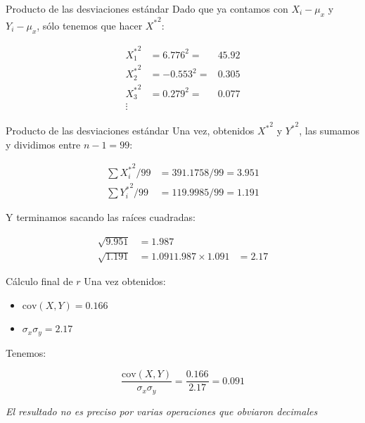 \documentclass[
  11pt,
  ignorenonframetext,
]{beamer}
\providecommand{\tightlist}{%
  \setlength{\itemsep}{0pt}\setlength{\parskip}{0pt}}
\begin{document}
\begin{frame}{Producto de las desviaciones estándar}
\protect\hypertarget{producto-de-las-desviaciones-estuxe1ndar-1}{}
Dado que ya contamos con \(X_i - \mu_x\) y \(Y_i - \mu_x\), sólo tenemos
que hacer \({X^*}^2\):

\begin{align*}
{X^*_1}^2 & = 6.776^2 = & 45.92 \\
{X^*_2}^2 & = -0.553^2 = & 0.305 \\
{X^*_3}^2 & = 0.279^2 = & 0.077 \\
\vdots
\end{align*}
\end{frame}

\begin{frame}{Producto de las desviaciones estándar}
\protect\hypertarget{producto-de-las-desviaciones-estuxe1ndar-2}{}
Una vez, obtenidos \({X^*}^2\) y \({Y^*}^2\), las sumamos y dividimos
entre \(n-1 = 99\):

\begin{align*}
\sum {X^*_i}^2/99 & = 391.1758/99 = 3.951\\
\sum {Y^*_i}^2/99 & = 119.9985/99 = 1.191
\end{align*}

Y terminamos sacando las raíces cuadradas:

\begin{align*}
\sqrt{9.951} & = 1.987\\
\sqrt{1.191} & = 1.091
1.987 \times 1.091 & = 2.17
\end{align*}
\end{frame}

\begin{frame}{Cálculo final de \(r\)}
\protect\hypertarget{cuxe1lculo-final-de-r}{}
Una vez obtenidos:

\begin{itemize}
\tightlist
\item
  \(\mathrm{cov}(X, Y) = 0.166\)
\item
  \(\sigma_x \sigma_y = 2.17\)
\end{itemize}

Tenemos:

\begin{equation*}
 \frac{\mathrm{cov}(X, Y)}{\sigma_x \sigma_y} = \frac{0.166}{2.17} = 0.091
\end{equation*}

\emph{El resultado no es preciso por varias operaciones que obviaron
decimales}
\end{frame}
\end{document}
